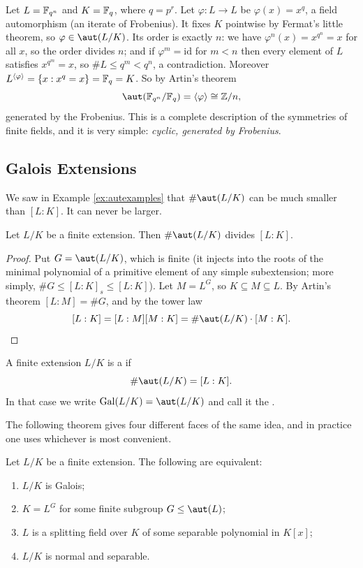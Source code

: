 \documentclass[a4paper]{scrartcl}
\newcommand{\Gal}{\operatorname{Gal}}
\begin{document}
\begin{example}\label{ex:frobgen}
	Let $L = \mathbb{F}_{q^n}$ and $K = \mathbb{F}_q$, where $q = p^r$. Let $\varphi : L \to L$ be $\varphi(x) = x^q$, a field automorphism (an iterate of Frobenius). It fixes $K$ pointwise by Fermat's little theorem, so $\varphi \in \aut(L/K)$. Its order is exactly $n$: we have $\varphi^n(x) = x^{q^n} = x$ for all $x$, so the order divides $n$; and if $\varphi^m = \mathrm{id}$ for $m<n$ then every element of $L$ satisfies $x^{q^m} = x$, so $\#L \leq q^m < q^n$, a contradiction. Moreover $L^{\langle\varphi\rangle} = \{x : x^q = x\} = \mathbb{F}_q = K$. So by Artin's theorem
	$$\aut(\F_{q^n}/\F_q) = \langle \varphi \rangle \cong \Z/n,$$
	generated by the Frobenius. This is a complete description of the symmetries of finite fields, and it is very simple: \emph{cyclic, generated by Frobenius}.
\end{example}

\subsection{Galois Extensions}

We saw in Example \ref{ex:autexamples} that $\#\aut(L/K)$ can be much smaller than $[L:K]$. It can never be larger.

\begin{proposition}\label{prop:autdivides}
	Let $L/K$ be a finite extension. Then $\#\aut(L/K)$ divides $[L:K]$.
\end{proposition}

\begin{proof}
	Put $G = \aut(L/K)$, which is finite (it injects into the roots of the minimal polynomial of a primitive element of any simple subextension; more simply, $\#G \leq [L:K]_s \leq [L:K]$). Let $M = L^G$, so $K \subseteq M \subseteq L$. By Artin's theorem $[L:M] = \#G$, and by the tower law
	$$[L:K] = [L:M][M:K] = \#\aut(L/K)\cdot[M:K]. \qedhere$$
\end{proof}

\begin{definition}
	A finite extension $L/K$ is a  if
	$$\#\aut(L/K) = [L:K].$$
	In that case we write $\Gal(L/K) = \aut(L/K)$ and call it the .
\end{definition}

The following theorem gives four different faces of the same idea, and in practice one uses whichever is most convenient.

\begin{theorem}\label{thm:galoistfae}
	Let $L/K$ be a finite extension. The following are equivalent:
	\begin{enumerate}[label=(\roman*)]
		\item $L/K$ is Galois;
		\item $K = L^G$ for some finite subgroup $G \leq \aut(L)$;
		\item $L$ is a splitting field over $K$ of some separable polynomial in $K[x]$;
		\item $L/K$ is normal and separable.
	\end{enumerate}
\end{theorem}
\end{document}
